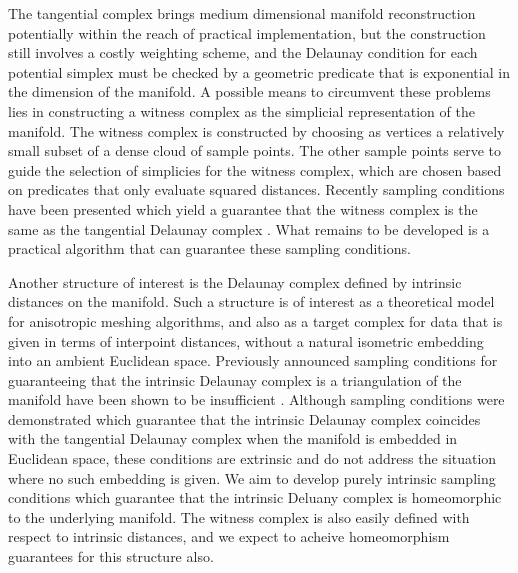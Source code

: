 The tangential complex brings medium dimensional manifold
reconstruction potentially within the reach of practical
implementation, but the construction still involves a costly weighting
scheme, and the Delaunay condition for each potential simplex must be
checked by a geometric predicate that is exponential in the dimension
of the manifold. A possible means to circumvent these problems lies in
constructing a witness complex as the simplicial representation of the
manifold. The witness complex is constructed by choosing as vertices a
relatively small subset of a dense cloud of sample points. The other
sample points serve to guide the selection of simplicies for the
witness complex, which are chosen based on predicates that only
evaluate squared distances. Recently sampling conditions have been
presented which yield a guarantee that the witness complex is the same
as the tangential Delaunay complex
\cite{boissonnat2011cgl,boissonnat2012stab}. What remains to be
developed is a practical algorithm that can guarantee these sampling
conditions. 

Another structure of interest is the Delaunay complex defined by
intrinsic distances on the manifold. Such a structure is of interest
as a theoretical model for anisotropic meshing algorithms, and also as
a target complex for data that is given in terms of interpoint
distances, without a natural isometric embedding into an ambient
Euclidean space. Previously announced sampling conditions
\cite{leibon2000} for guaranteeing that the intrinsic Delaunay complex
is a triangulation of the manifold have been shown to be insufficient
\cite{boissonnat2012stab}. Although sampling conditions were
demonstrated which guarantee that the intrinsic Delaunay complex
coincides with the tangential Delaunay complex when the manifold is
embedded in Euclidean space, these conditions are extrinsic and do not
address the situation where no such embedding is given. We aim to
develop purely intrinsic sampling conditions which guarantee that the
intrinsic Deluany complex is homeomorphic to the underlying
manifold. The witness complex is also easily defined with respect to
intrinsic distances, and we expect to acheive homeomorphism guarantees
for this structure also.


